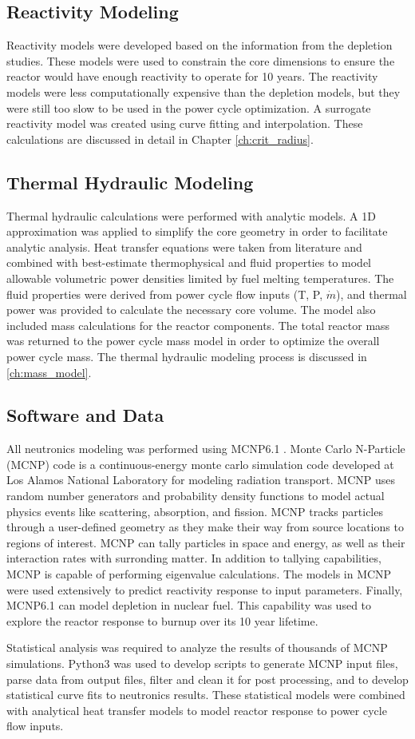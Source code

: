 \subsection{Reactivity Modeling}
Reactivity models were developed based on the information from the depletion
studies. These models were used to constrain the core dimensions to ensure the
reactor would have enough reactivity to operate for 10 years. The reactivity
models were less computationally expensive than the depletion models, but they
were still too slow to be used in the power cycle optimization. A surrogate
reactivity model was created using curve fitting and interpolation.
These calculations are discussed in detail in Chapter \ref{ch:crit_radius}.

\subsection{Thermal Hydraulic Modeling}
Thermal hydraulic calculations were performed with analytic models. A 1D
approximation was applied to simplify the core geometry in order to facilitate analytic
analysis. Heat transfer equations were taken from literature and combined with
best-estimate thermophysical and fluid properties to model allowable volumetric
power densities limited by fuel melting temperatures. The fluid properties were
derived from power cycle flow inputs (T, P, $\dot{m}$), and thermal power was
provided to calculate the necessary core volume. The model also included mass
calculations for the reactor components. The total reactor mass was returned to
the power cycle mass model in order to optimize the overall power cycle mass.
The thermal hydraulic modeling process is discussed in \ref{ch:mass_model}.

\subsection{Software and Data}
All neutronics modeling was performed using MCNP6.1 \cite{mcnp_citation}. Monte
Carlo N-Particle (MCNP) code is a continuous-energy monte carlo simulation code
developed at Los Alamos National Laboratory
for modeling radiation transport. MCNP uses random number generators and
probability density functions to model actual physics events like scattering,
absorption, and fission. MCNP tracks particles through a user-defined geometry
as they make their way from source locations to regions of interest. MCNP can
tally particles in space and energy, as well as their interaction rates with
surronding matter. In addition to tallying capabilities, MCNP is capable of
performing eigenvalue calculations. The \keff models in MCNP were used
extensively to predict reactivity response to input parameters. Finally, MCNP6.1
can model depletion in nuclear fuel. This capability was used to explore the
reactor response to burnup over its 10 year lifetime.

Statistical analysis was required to analyze the results of thousands of MCNP
simulations. Python3 was used to develop scripts to generate MCNP input files, parse data from output
files, filter and clean it for post processing, and to develop statistical curve
fits to neutronics results. These statistical models were combined with
analytical heat transfer models to model reactor response to power cycle flow
inputs.
